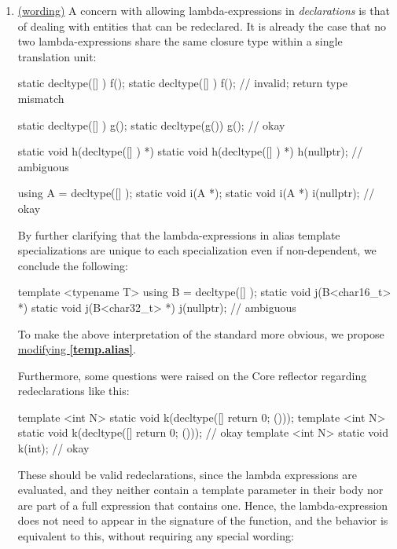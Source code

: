 \documentclass{wg21}
\begin{document}
\begin{enumerate}
  \item \label{discussion.redeclarations}
    \hyperref[wording.redeclarations]{(wording)}
    A concern with allowing lambda-expressions in \textit{declarations} is
    that of dealing with entities that can be redeclared. It is already the
    case that no two lambda-expressions share the same closure type within a
    single translation unit:

\begin{cpp}
static decltype([] { }) f();
static decltype([] { }) f(); // invalid; return type mismatch

static decltype([] { }) g();
static decltype(g()) g(); // okay

static void h(decltype([] { }) *) { }
static void h(decltype([] { }) *) { }
h(nullptr); // ambiguous

using A = decltype([] { });
static void i(A *);
static void i(A *) { }
i(nullptr); // okay
\end{cpp}

   By further clarifying that the lambda-expressions in alias template
   specializations are unique to each specialization even if non-dependent,
   we conclude the following:

\begin{cpp}
template <typename T>
using B = decltype([] { });
static void j(B<char16_t> *) { }
static void j(B<char32_t> *) { }
j(nullptr); // ambiguous
\end{cpp}

    To make the above interpretation of the standard more obvious, we propose
    \hyperref[wording.redeclarations]{modifying \textbf{[temp.alias]}}.

    Furthermore, some questions were raised on the Core reflector regarding
    redeclarations like this:
\begin{cpp}
template <int N> static void k(decltype([]{ return 0; }()));
template <int N> static void k(decltype([]{ return 0; }())); // okay
template <int N> static void k(int);                         // okay
\end{cpp}

    These should be valid redeclarations, since the lambda expressions are
    evaluated, and they neither contain a template parameter in their body
    nor are part of a full expression that contains one. Hence, the lambda-expression
    does not need to appear in the signature of the function, and the behavior
    is equivalent to this, without requiring any special wording:


\end{enumerate}
\end{document}

